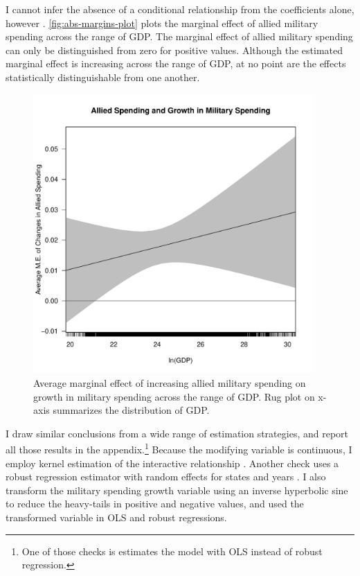 \documentclass[12pt]{article}
\begin{document}
I cannot infer the absence of a conditional relationship from the coefficients alone, however \citep{BramborClarkGolder2006}. 
\autoref{fig:abs-margins-plot} plots the marginal effect of allied military spending across the range of GDP. 
The marginal effect of allied military spending can only be distinguished from zero for positive values. 
Although the estimated marginal effect is increasing across the range of GDP, at no point are the effects statistically distinguishable from one another. 


\begin{figure}
	\centering
		\includegraphics[width=0.95\textwidth]{abs-margins-plot.pdf}
	\caption{Average marginal effect of increasing allied military spending on growth in military spending across the range of GDP. Rug plot on x-axis summarizes the distribution of GDP.}
		\label{fig:abs-margins-plot}
\end{figure}



I draw similar conclusions from a wide range of estimation strategies, and report all those results in the appendix.\footnote{One of those checks is estimates the model with OLS instead of robust regression.}
Because the modifying variable is continuous, I employ kernel estimation of the interactive relationship \citep{Hainmuelleretal2019}.
Another check uses a robust regression estimator with random effects for states and years \citep{Koller2016}. 
I also transform the military spending growth variable using an inverse hyperbolic sine to reduce the heavy-tails in positive and negative values, and used the transformed variable in OLS and robust regressions. 
\end{document}
